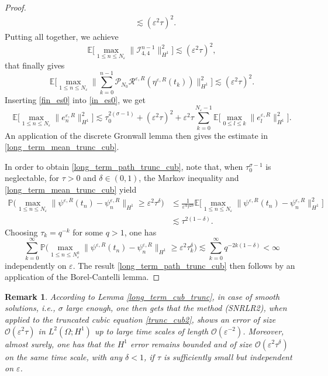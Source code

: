 \documentclass[a4paper]{amsart}
\newtheorem{remark}{Remark}[section]
\begin{document}
\begin{proof}
\begin{align*}
        &\lesssim (\varepsilon^2 \tau)^2.
   \end{align*}
   Putting all together, we achieve 
   $$
\mathbb{E}\big[\max_{1\le n\le N_\varepsilon}\|\mathcal{I}^{n-1}_{4,4}\|^2_{H^1}\big]\lesssim(\varepsilon^2\tau)^2,
   $$
   that finally gives
   \begin{equation}
       \label{fin_es0}
   \mathbb{E}\big[\max_{1\le n\le N_\varepsilon}\|\sum_{k=0}^{n-1}\mathcal{P}_{N_0}\mathcal{R}^{\varepsilon,R}(\eta^{\varepsilon,R}(t_k))\|^2_{H^1}\big]\lesssim(\varepsilon^2 \tau)^2.
    \end{equation}
    Inserting \eqref{fin_es0} into \eqref{in_es0}, we get
    $$
    \mathbb{E}\big[\max_{1\le n\le N_\varepsilon}\|e^{\varepsilon,R}_{n}\|_{H^1}^2\big]\lesssim \tau_0^{2(\sigma-1)}+ (\varepsilon^2\tau)^2+\varepsilon^2 \tau\sum_{k=0}^{N_\varepsilon-1}\mathbb{E}\big[\max_{0\le l \le k}\|e^{\varepsilon,R}_{l}\|_{H^1}^2\big].
    $$
    An application of the discrete Gronwall lemma then gives the estimate in \eqref{long_term_mean_trunc_cub}. 

    In order to obtain \eqref{long_term_path_trunc_cub}, note that, when $\tau_0^{\sigma-1}$ is neglectable, for $\tau>0$ and $\delta\in(0,1)$, the Markov inequality and \eqref{long_term_mean_trunc_cub} yield
    \begin{align*}
    \mathbb{P}\big(\max_{1\le n\le N_\varepsilon}\|\psi^{\varepsilon,R}(t_n)-\psi_n^{\varepsilon,R}\|_{H^1}\ge \varepsilon^2 \tau^\delta\big)
    &\le \frac{1}{\varepsilon^4 \tau^{2\delta}}\mathbb{E}\big[\max_{1\le n\le N_\varepsilon}\|\psi^{\varepsilon,R}(t_n)-\psi_n^{\varepsilon,R}\|^2_{H^1}\big]\\
    &\lesssim \tau^{2(1-\delta)}.
   \end{align*}
   Choosing $\tau_k=q^{-k}$ for some $q>1$, one has
   $$
   \sum_{k=0}^\infty \mathbb{P}\big(\max_{1\le n\le N^k_\varepsilon}\|\psi^{\varepsilon,R}(t_n)-\psi_n^{\varepsilon,R}\|_{H^1}\ge \varepsilon^2 \tau_k^\delta\big)
   \lesssim \sum_{k=0}^\infty q^{-2k(1-\delta)}<\infty
   $$
   independently on $\varepsilon$. The result \eqref{long_term_path_trunc_cub} then follows by an application of the Borel-Cantelli lemma.
\end{proof}

\begin{remark}
    According to Lemma \ref{long_term_cub_trunc}, in case of smooth solutions, i.e., $\sigma$ large enough, one then gets that the method (SNRLR2), when applied to the truncated cubic equation \eqref{trunc_cub2}, shows an error of size $\mathcal{O}(\varepsilon^2\tau)$ in $L^2(\Omega; H^1)$ up to large time scales of length $\mathcal{O}(\varepsilon^{-2})$. Moreover, almost surely, one has that the $H^1$ error remains bounded and of size $\mathcal{O}(\varepsilon^2\tau^{\delta})$ on the same time scale, with any $\delta<1$, if $\tau$ is sufficiently small but independent on $\varepsilon$.
\end{remark}
\end{document}
